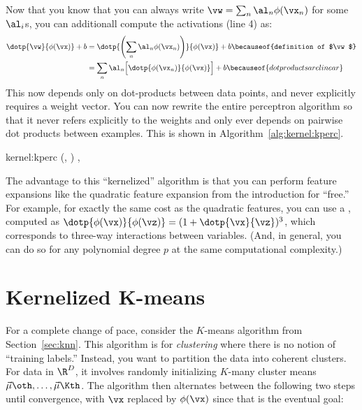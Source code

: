 Now that you know that you can always write $\vw = \sum_n \al_n
\phi(\vx_n)$ for some $\al_i$s, you can additionall compute the
activations (line 4) as:
%
\begin{align}
\dotp{\vw}{\phi(\vx)}+b
&= \dotp{\left( \sum_n \al_n \phi(\vx_n) \right)}{\phi(\vx)} + b
\becauseof{definition of $\vw$} \\
&= \sum_n \al_n \Big[ \dotp{\phi(\vx_n)}{\phi(\vx)} \Big] + b
\becauseof{dot products are linear}
\end{align}
%
This now depends only on dot-products between data points, and never
explicitly requires a weight vector.  You can now rewrite the entire
perceptron algorithm so that it never refers explicitly to the weights
and only ever depends on pairwise dot products between examples.  This
is shown in Algorithm~\ref{alg:kernel:kperc}.

\newalgorithm%
  {kernel:kperc}%
  {(, )}
  {
\ENDIF
\ENDFOR
\ENDFOR
\RETURN \VAR{$\vec\al$}, 
}

The advantage to this ``kernelized'' algorithm is that you can perform
feature expansions like the quadratic feature expansion from the
introduction for ``free.''  For example, for exactly the same cost as
the quadratic features, you can use a ,
computed as $\dotp{\phi(\vx)}{\phi(\vz)} = (1 + \dotp{\vx}{\vz})^3$,
which corresponds to three-way interactions between variables.  (And,
in general, you can do so for any polynomial degree $p$ at the same
computational complexity.)

\section{Kernelized K-means}

For a complete change of pace, consider the $K$-means algorithm from
Section~\ref{sec:knn}.  This algorithm is for \emph{clustering}
where there is no notion of ``training labels.''  Instead, you want to
partition the data into coherent clusters.  For data in $\R^D$, it
involves randomly initializing $K$-many cluster means $\vec\mu\oth,
\dots, \vec\mu\Kth$.  The algorithm then alternates between the
following two steps until convergence, with $\vx$ replaced by
$\phi(\vx)$ since that is the eventual goal:

